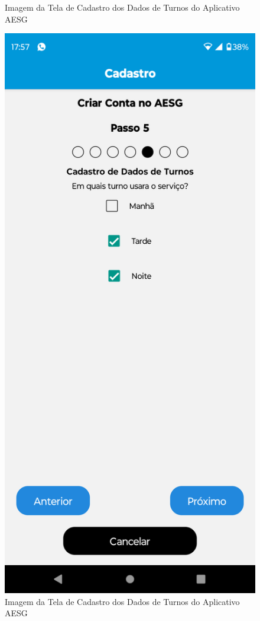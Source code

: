 \documentclass[
    12pt,                   %
    openright,              %
    oneside,                %
    a4paper,                %
    sumario=tradicional,    %
    english,                %
    brazil,                 %
    ]{abntex2}
\begin{document}
\begin{figure}[!h]
\begin{minipage}{0.5\textwidth}
                    \caption[Imagem da Tela de Cadastro dos Dados de Turnos do Aplicativo AESG]{ 
                    Imagem da Tela de Cadastro dos Dados de Turnos do Aplicativo AESG}
                    \label{fig:AppTelaCadastro14}
                \end{minipage}%
                \begin{minipage}{0.5\textwidth}
                    \centering
                    \includegraphics[width=0.8\linewidth]{Imagens/App Images User/AUCadastro5.png}
                    \caption[Imagem da Tela de Cadastro dos Dados de Turnos Preenchido do Aplicativo AESG]{ 
                    Imagem da Tela de Cadastro dos Dados  de Turnos do Aplicativo AESG}
                    \label{fig:AppTelaCadastro5}
                \end{minipage}
            \end{figure}
\end{document}
